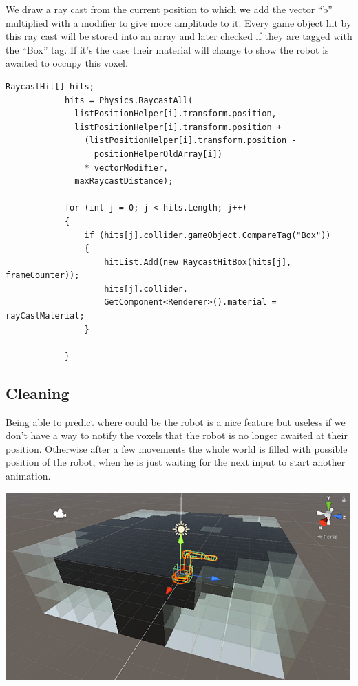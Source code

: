 \documentclass{scrartcl}
\begin{document}
We draw a ray cast from the current position to which we add the vector “b” multiplied with a modifier to give more amplitude to it. 
Every game object hit by this ray cast will be stored into an array and later checked if they are tagged with the “Box” tag. 
If it’s the case their material will change to show the robot is awaited to occupy this voxel.

\begin{lstlisting}[language={[Sharp]C}]
  RaycastHit[] hits;
            hits = Physics.RaycastAll(
              listPositionHelper[i].transform.position,
              listPositionHelper[i].transform.position +
                (listPositionHelper[i].transform.position - 
                  positionHelperOldArray[i]) 
                * vectorModifier,
              maxRaycastDistance);

            for (int j = 0; j < hits.Length; j++)
            {
                if (hits[j].collider.gameObject.CompareTag("Box"))
                {
                    hitList.Add(new RaycastHitBox(hits[j], frameCounter));
                    hits[j].collider.
                    GetComponent<Renderer>().material = rayCastMaterial;
                }
                   
            }

\end{lstlisting}

\subsection{Cleaning}

Being able to predict where could be the robot is a nice feature but useless if we don’t have a way to notify the voxels that the robot is no longer awaited at their position. 
Otherwise after a few movements the whole world is filled with possible position of the robot, when he is just waiting for the next input to start another animation.

\includegraphics{uncleaned}
\end{document}
